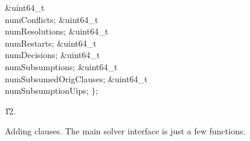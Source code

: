 \&{uint64\_t} \\{numConflicts};\6
\&{uint64\_t} \\{numResolutions};\6
\&{uint64\_t} \\{numRestarts};\6
\&{uint64\_t} \\{numDecisions};\6
\&{uint64\_t} \\{numSubsumptions};\6
\&{uint64\_t} \\{numSubsumedOrigClauses};\6
\&{uint64\_t} \\{numSubsumptionUips};\2\6
${}\}{}$;\par
\U12.\fi

Adding clauses. The main solver interface is just a few functions.


